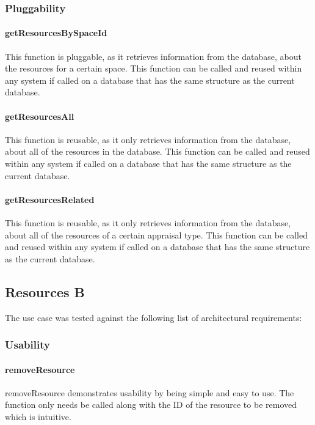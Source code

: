\documentclass[a4paper]{article}
\begin{document}
\subsubsection {Pluggability}

\paragraph{getResourcesBySpaceId}
This function is pluggable, as it retrieves information from the database, about the resources for a certain space. This function can be called and reused within any system if called on a database that has the same structure as the current database.

\paragraph{getResourcesAll}
This function is reusable, as it only retrieves information from the database, about all of the resources in the database. This function can be called and reused within any system if called on a database that has the same structure as the current database.

\paragraph{getResourcesRelated}
This function is reusable, as it only retrieves information from the database, about all of the resources of a certain appraisal type. This function can be called and reused within any system if called on a database that has the same structure as the current database.


\subsection {Resources B}
The use case was tested against the following list of architectural requirements:
\subsubsection {Usability}

\paragraph{removeResource}
removeResource demonstrates usability by being simple and easy to use. The function only needs be called along with the ID of the resource to be removed which is intuitive.
\end{document}

